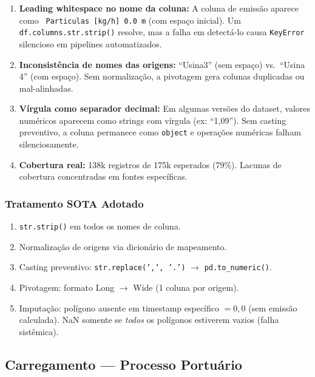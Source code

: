 \documentclass[12pt, a4paper]{article}
\begin{document}
\begin{enumerate}
    \item \textbf{Leading whitespace no nome da coluna:} A coluna de emissão
          aparece como \texttt{\ Particulas [kg/h] 0.0 m} (com espaço
          inicial). Um \texttt{df.columns.str.strip()} resolve, mas a falha
          em detectá-lo causa \texttt{KeyError} silencioso em pipelines
          automatizados.

    \item \textbf{Inconsistência de nomes das origens:} ``Usina3'' (sem espaço)
          vs.\ ``Usina 4'' (com espaço). Sem normalização, a pivotagem
          gera colunas duplicadas ou mal-alinhadas.

    \item \textbf{Vírgula como separador decimal:} Em algumas versões do
          dataset, valores numéricos aparecem como strings com vírgula
          (ex: ``1,09''). Sem casting preventivo, a coluna permanece como
          \texttt{object} e operações numéricas falham silenciosamente.

    \item \textbf{Cobertura real:} 138k registros de 175k esperados (79\%).
          Lacunas de cobertura concentradas em fontes específicas.
\end{enumerate}

\subsubsection{Tratamento SOTA Adotado}

\begin{enumerate}
    \item \texttt{str.strip()} em todos os nomes de coluna.
    \item Normalização de origens via dicionário de mapeamento.
    \item Casting preventivo: \texttt{str.replace(',', '.')} $\to$
          \texttt{pd.to\_numeric()}.
    \item Pivotagem: formato Long $\to$ Wide (1 coluna por origem).
    \item Imputação: polígono ausente em timestamp específico $= 0{,}0$
          (sem emissão calculada). NaN somente se \textit{todos} os polígonos
          estiverem vazios (falha sistêmica).
\end{enumerate}

\subsection{Carregamento — Processo Portuário}
\label{subsec:carregamento}
\end{document}
